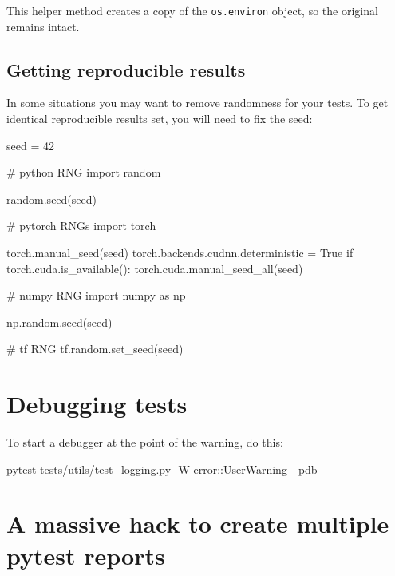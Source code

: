 \documentclass[
]{report}
\newenvironment{Shaded}{\begin{snugshade}}{\end{snugshade}}
\newcommand{\AttributeTok}[1]{\textcolor[rgb]{0.40,0.45,0.13}{#1}}
\newcommand{\CommentTok}[1]{\textcolor[rgb]{0.37,0.37,0.37}{#1}}
\newcommand{\ControlFlowTok}[1]{\textcolor[rgb]{0.00,0.23,0.31}{#1}}
\newcommand{\DecValTok}[1]{\textcolor[rgb]{0.68,0.00,0.00}{#1}}
\newcommand{\ExtensionTok}[1]{\textcolor[rgb]{0.00,0.23,0.31}{#1}}
\newcommand{\ImportTok}[1]{\textcolor[rgb]{0.00,0.46,0.62}{#1}}
\newcommand{\NormalTok}[1]{\textcolor[rgb]{0.00,0.23,0.31}{#1}}
\newcommand{\OperatorTok}[1]{\textcolor[rgb]{0.37,0.37,0.37}{#1}}
\newcommand{\VariableTok}[1]{\textcolor[rgb]{0.07,0.07,0.07}{#1}}
\begin{document}
This helper method creates a copy of the \texttt{os.environ} object, so
the original remains intact.

\subsection{Getting reproducible
results}\label{getting-reproducible-results}

In some situations you may want to remove randomness for your tests. To
get identical reproducible results set, you will need to fix the seed:

\begin{Shaded}
\begin{Highlighting}[]
\NormalTok{seed }\OperatorTok{=} \DecValTok{42}

\CommentTok{\# python RNG}
\ImportTok{import}\NormalTok{ random}

\NormalTok{random.seed(seed)}

\CommentTok{\# pytorch RNGs}
\ImportTok{import}\NormalTok{ torch}

\NormalTok{torch.manual\_seed(seed)}
\NormalTok{torch.backends.cudnn.deterministic }\OperatorTok{=} \VariableTok{True}
\ControlFlowTok{if}\NormalTok{ torch.cuda.is\_available():}
\NormalTok{    torch.cuda.manual\_seed\_all(seed)}

\CommentTok{\# numpy RNG}
\ImportTok{import}\NormalTok{ numpy }\ImportTok{as}\NormalTok{ np}

\NormalTok{np.random.seed(seed)}

\CommentTok{\# tf RNG}
\NormalTok{tf.random.set\_seed(seed)}
\end{Highlighting}
\end{Shaded}

\section{Debugging tests}\label{debugging-tests}

To start a debugger at the point of the warning, do this:

\begin{Shaded}
\begin{Highlighting}[]
\ExtensionTok{pytest}\NormalTok{ tests/utils/test\_logging.py }\AttributeTok{{-}W}\NormalTok{ error::UserWarning }\AttributeTok{{-}{-}pdb}
\end{Highlighting}
\end{Shaded}

\section{A massive hack to create multiple pytest
reports}\label{a-massive-hack-to-create-multiple-pytest-reports}
\end{document}
